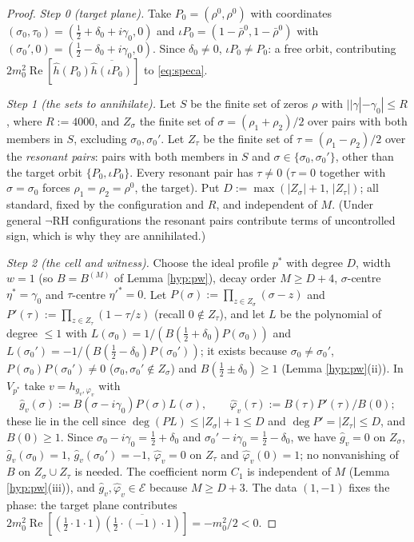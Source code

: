 \documentclass[11pt,reqno]{amsart}
\theoremstyle{definition}
\newcommand{\half}{\tfrac12}
\begin{document}
\begin{proof}
\emph{Step 0 (target plane).} Take \(P_0=(\rho^0,\rho^0)\) with coordinates
\((\sigma_0,\tau_0)=(\half+\delta_0+i\gamma_0,0)\) and
\(\iota P_0=(1-\bar\rho^0,1-\bar\rho^0)\) with
\((\sigma_0',0)=(\half-\delta_0+i\gamma_0,0)\). Since \(\delta_0\neq0\),
\(\iota P_0\neq P_0\): a free orbit, contributing
\(2m_0^2\operatorname{Re}[\hat h(P_0)\overline{\hat h(\iota P_0)}]\) to
\eqref{eq:speca}.

\emph{Step 1 (the sets to annihilate).} Let \(S\) be the finite set of zeros
\(\rho\) with \(||\gamma|-\gamma_0|\leq R\), where \(R:=4000\), and \(Z_\sigma\) the finite set of
\(\sigma=(\rho_1+\rho_2)/2\) over pairs with both members in \(S\), excluding
\(\sigma_0,\sigma_0'\). Let \(Z_\tau\) be the finite set of
\(\tau=(\rho_1-\rho_2)/2\) over the \emph{resonant pairs}: pairs with both
members in \(S\) and \(\sigma\in\{\sigma_0,\sigma_0'\}\), other than the target
orbit \(\{P_0,\iota P_0\}\). Every resonant pair has \(\tau\neq0\) (\(\tau=0\)
together with \(\sigma=\sigma_0\) forces \(\rho_1=\rho_2=\rho^0\), the target).
Put \(D:=\max(|Z_\sigma|+1,\,|Z_\tau|)\); all standard, fixed by the
configuration and \(R\), and independent of \(M\). \textup{(}Under general \(\neg\)RH configurations the resonant
pairs contribute terms of uncontrolled sign, which is why they are
annihilated.\textup{)}

\emph{Step 2 (the cell and witness).} Choose the ideal profile \(p^*\) with
degree \(D\), width \(w=1\) (so \(B=B^{(M)}\) of Lemma \ref{hyp:pw}), decay
order \(M\geq D+4\), \(\sigma\)-centre \(\eta^*=\gamma_0\) and \(\tau\)-centre
\(\eta'^*=0\). Let \(P(\sigma):=\prod_{z\in Z_\sigma}(\sigma-z)\) and
\(P'(\tau):=\prod_{z\in Z_\tau}(1-\tau/z)\) (recall \(0\notin Z_\tau\)), and let
\(L\) be the polynomial of degree \(\leq1\) with
\(L(\sigma_0)=1/(B(\half+\delta_0)P(\sigma_0))\) and
\(L(\sigma_0')=-1/(B(\half-\delta_0)P(\sigma_0'))\); it exists because
\(\sigma_0\neq\sigma_0'\), \(P(\sigma_0)P(\sigma_0')\neq0\)
(\(\sigma_0,\sigma_0'\notin Z_\sigma\)) and \(B(\half\pm\delta_0)\geq1\)
(Lemma \ref{hyp:pw}(ii)). In \(V_{p^*}\) take \(v=h_{g_v,\varphi_v}\) with
\[
\hat g_v(\sigma):=B(\sigma-i\gamma_0)P(\sigma)L(\sigma),\qquad
\hat\varphi_v(\tau):=B(\tau)P'(\tau)/B(0);
\]
these lie in the cell since \(\deg(PL)\leq|Z_\sigma|+1\leq D\) and
\(\deg P'=|Z_\tau|\leq D\), and \(B(0)\geq1\). Since
\(\sigma_0-i\gamma_0=\half+\delta_0\) and \(\sigma_0'-i\gamma_0=\half-\delta_0\),
we have \(\hat g_v=0\) on \(Z_\sigma\), \(\hat g_v(\sigma_0)=1\),
\(\hat g_v(\sigma_0')=-1\), \(\hat\varphi_v=0\) on \(Z_\tau\) and
\(\hat\varphi_v(0)=1\); no nonvanishing of \(B\) on \(Z_\sigma\cup Z_\tau\) is
needed. The coefficient norm \(C_1\) is independent of \(M\) (Lemma
\ref{hyp:pw}(iii)), and \(\hat g_v,\hat\varphi_v\in\mathcal E\) because
\(M\geq D+3\). The data \((1,-1)\) fixes the
phase: the target plane contributes
\(2m_0^2\operatorname{Re}[(\half\cdot1\cdot1)\overline{(\half\cdot(-1)\cdot1)}]
=-m_0^2/2<0\).


\end{proof}
\end{document}
